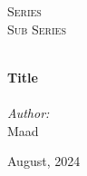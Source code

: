 
\begin{titlepage}
    \vbox{ }
    \vbox{ }
    \begin{center}

        \textsc{\LARGE Series}\\[1.5cm]
        \textsc{\Large Sub Series}\\[0.5cm]
        \vbox{ }

        \HRule \\[0.5cm]
        { \huge \bfseries Title}\\[0.3cm]
        \HRule \\[1.5cm]

        \large
        \emph{Author:}\\
        Maad
        \vfill

        {\large August, 2024}

    \end{center}
\end{titlepage}

